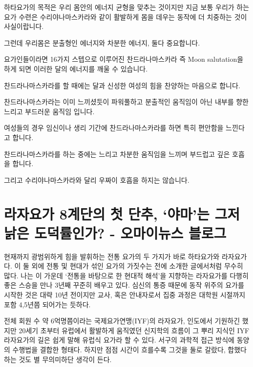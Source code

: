 \documentclass[12pt, a4paper, oneside]{book}
\let\stdsection\section
\renewcommand\section{\newpage\stdsection}
\begin{document}
하타요가의 목적은 우리 몸안의 에너지 균형을 맞추는 것이지만 지금 보통 우리가 하는 요가 수련은 수리야나마스카라와 같이 활발하게 몸을 데우는 동작에 더 치중하는 것이 사실이랍니다.

그런데 우리몸은 분출형인 에너지와 차분한 에너지, 둘다 중요합니다.

요가인들이라면 16가지 스텝으로 이루어진 찬드라나마스카라 즉 Moon salutation을 하게 되면 이러한 달의 에너지를 깨울 수 있습니다.


찬드라나마스카라를 할 때에는 달과 신성한 여성의 힘을 찬양하는 마음으로 합니다.

찬드라나마스카라는 이미 느끼셨듯이 파워풀하고 분출적인 움직임이 아닌 내부를 향한 느리고 부드러운 움직임 입니다.

여성들의 경우 임신이나 생리 기간에 찬드라나마스카라를 하면 특히 편안함을 느낀다고 합니다.

찬드라나마스카라를 하는 중에는 느리고 차분한 움직임을 느끼며 부드럽고 깊은 호흡을 합니다.

그리고 수리야나마스카라와 달리 우짜이 호흡을 하지는 않습니다.




%
	\section{라자요가 8계단의 첫 단추, ‘야마’는 그저 낡은 도덕률인가? - 오마이뉴스 블로그}



  
현재까지 광범위하게 힘을 발휘하는 전통 요가의 두 가지가 바로 하타요가와 라자요가다. 이 둘 외에 전통 및 현대가 섞인 요가의 가짓수는 전에 소개한 글에서처럼 무수히 많다. 나는 이 가운데 ‘전통을 바탕으로 한 현대적 해석’을 지향하는 라자요가를 다행히 좋은 스승을 만나 3년째 꾸준히 배우고 있다. 심신의 통증 때문에 동작 위주의 요가를 시작한 것은 대략 10년 전이지만 교사, 혹은 안내자로서 집중 과정은 대학원 시절까지 포함 4,5년쯤 되어가는 듯하다.

전체 회원 수 약 6억명쯤이라는 국제요가연맹(IYF)의 라자요가, 인도에서 기원하긴 했지만 20세기 초부터 유럽에서 활발하게 움직였던 신지학의 흐름이 그 뿌리 지식인 IYF 라자요가의 길은 쉽게 말해 유럽식 요가라 할 수 있다. 서구의 과학적 접근 방식에 동양의 수행법을 결합한 형태다. 하지만 점점 시간이 흐를수록 그것을 둘로 갈랐다, 합했다 하는 것도 별 무의미하단 생각이 든다. 
\end{document}
